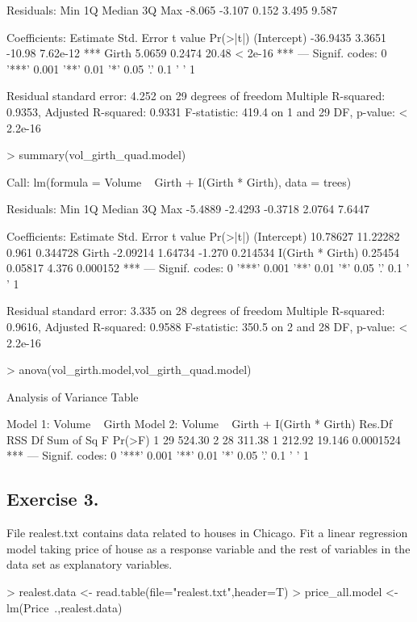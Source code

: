 \documentclass[a4paper]{article}
\begin{document}
\begin{itemize}
\begin{Schunk}
\begin{Soutput}
Residuals:
   Min     1Q Median     3Q    Max 
-8.065 -3.107  0.152  3.495  9.587 

Coefficients:
            Estimate Std. Error t value Pr(>|t|)    
(Intercept) -36.9435     3.3651  -10.98 7.62e-12 ***
Girth         5.0659     0.2474   20.48  < 2e-16 ***
---
Signif. codes:  0 '***' 0.001 '**' 0.01 '*' 0.05 '.' 0.1 ' ' 1

Residual standard error: 4.252 on 29 degrees of freedom
Multiple R-squared:  0.9353,	Adjusted R-squared:  0.9331 
F-statistic: 419.4 on 1 and 29 DF,  p-value: < 2.2e-16
\end{Soutput}
\begin{Sinput}
> summary(vol_girth_quad.model)
\end{Sinput}
\begin{Soutput}
Call:
lm(formula = Volume ~ Girth + I(Girth * Girth), data = trees)

Residuals:
    Min      1Q  Median      3Q     Max 
-5.4889 -2.4293 -0.3718  2.0764  7.6447 

Coefficients:
                 Estimate Std. Error t value Pr(>|t|)    
(Intercept)      10.78627   11.22282   0.961 0.344728    
Girth            -2.09214    1.64734  -1.270 0.214534    
I(Girth * Girth)  0.25454    0.05817   4.376 0.000152 ***
---
Signif. codes:  0 '***' 0.001 '**' 0.01 '*' 0.05 '.' 0.1 ' ' 1

Residual standard error: 3.335 on 28 degrees of freedom
Multiple R-squared:  0.9616,	Adjusted R-squared:  0.9588 
F-statistic: 350.5 on 2 and 28 DF,  p-value: < 2.2e-16
\end{Soutput}
\begin{Sinput}
> anova(vol_girth.model,vol_girth_quad.model)
\end{Sinput}
\begin{Soutput}
Analysis of Variance Table

Model 1: Volume ~ Girth
Model 2: Volume ~ Girth + I(Girth * Girth)
  Res.Df    RSS Df Sum of Sq      F    Pr(>F)    
1     29 524.30                                  
2     28 311.38  1    212.92 19.146 0.0001524 ***
---
Signif. codes:  0 '***' 0.001 '**' 0.01 '*' 0.05 '.' 0.1 ' ' 1
\end{Soutput}
\end{Schunk}
\end{itemize}
\subsection{Exercise 3.} File realest.txt contains data related to houses in
Chicago. Fit a linear regression model taking price of house as a response
variable and the rest of variables in the data set as explanatory variables.
\begin{Schunk}
\begin{Sinput}
> realest.data <- read.table(file="realest.txt",header=T)
> price_all.model <- lm(Price~.,realest.data)	
\end{Sinput}
\end{Schunk}
\end{document}
